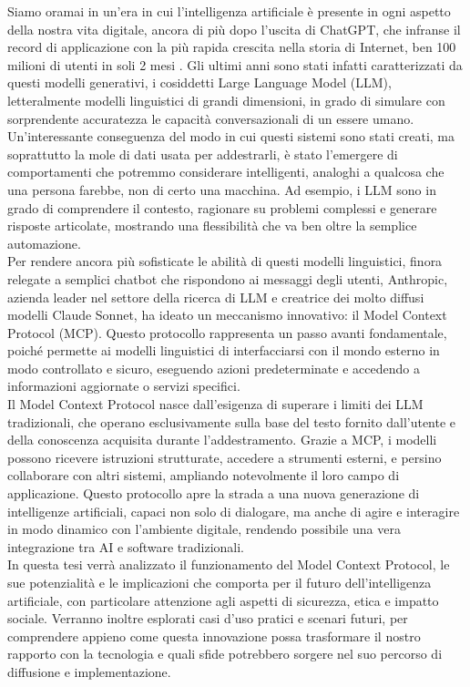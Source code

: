 ﻿Siamo oramai in un'era in cui l'intelligenza artificiale è presente in ogni aspetto della nostra vita digitale, ancora di 
più dopo l'uscita di ChatGPT, che infranse il record di applicazione con la più rapida crescita nella storia di Internet, 
ben 100 milioni di utenti in soli 2 mesi \cite{ubs2023latest}. Gli ultimi anni sono stati infatti caratterizzati da questi 
modelli generativi, i cosiddetti Large Language Model (LLM), letteralmente modelli linguistici di grandi dimensioni, in grado di 
simulare con sorprendente accuratezza le capacità conversazionali di un essere umano. \\
Un'interessante conseguenza del modo in cui questi sistemi sono stati creati, ma soprattutto la mole di dati usata per addestrarli, è stato l’emergere di comportamenti che potremmo considerare intelligenti, analoghi a qualcosa che una persona farebbe, non di certo una macchina. Ad esempio, i LLM sono in grado di comprendere il contesto, ragionare su problemi complessi e generare risposte articolate, mostrando una flessibilità che va ben oltre la semplice automazione. \\
Per rendere ancora più sofisticate le abilità di questi modelli linguistici, finora relegate a semplici chatbot che rispondono ai messaggi degli utenti, Anthropic, azienda leader nel settore della ricerca di LLM e creatrice dei molto diffusi modelli Claude Sonnet, ha ideato un meccanismo innovativo: il Model Context Protocol (MCP). Questo protocollo rappresenta un passo avanti fondamentale, poiché permette ai modelli linguistici di interfacciarsi con il mondo esterno in modo controllato e sicuro, eseguendo azioni predeterminate e accedendo a informazioni aggiornate o servizi specifici. \\
Il Model Context Protocol nasce dall’esigenza di superare i limiti dei LLM tradizionali, che operano esclusivamente sulla base del testo fornito dall’utente e della conoscenza acquisita durante l’addestramento. Grazie a MCP, i modelli possono ricevere istruzioni strutturate, accedere a strumenti esterni, e persino collaborare con altri sistemi, ampliando notevolmente il loro campo di applicazione. Questo protocollo apre la strada a una nuova generazione di intelligenze artificiali, capaci non solo di dialogare, ma anche di agire e interagire in modo dinamico con l’ambiente digitale, rendendo possibile una vera integrazione tra AI e software tradizionali. \\
In questa tesi verrà analizzato il funzionamento del Model Context Protocol, le sue potenzialità e le implicazioni che comporta per il futuro dell’intelligenza artificiale, con particolare attenzione agli aspetti di sicurezza, etica e impatto sociale. Verranno inoltre esplorati casi d'uso pratici e scenari futuri, per comprendere appieno come questa innovazione possa trasformare il nostro rapporto con la tecnologia e quali sfide potrebbero sorgere nel suo percorso di diffusione e implementazione.
